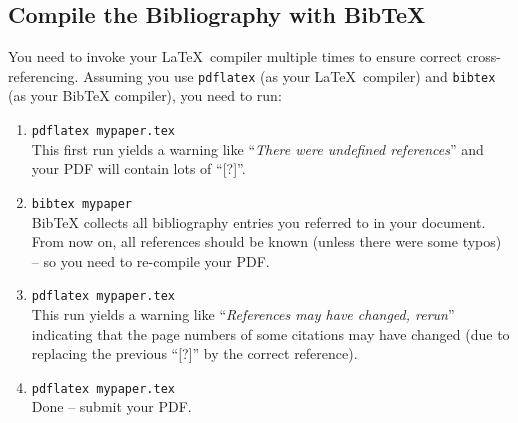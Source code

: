 \documentclass[11pt,a4paper]{article}
\begin{document}
%
\subsection{Compile the Bibliography with BibTeX}
\label{sec-bibtex-compile}

You need to invoke your \LaTeX~compiler multiple times to ensure correct 
cross-referencing.
Assuming you use \texttt{pdflatex} (as your \LaTeX~compiler) and \texttt{bibtex} (as your BibTeX compiler), you need to run:
\begin{enumerate}
 
\item \texttt{pdflatex mypaper.tex}\\[.5em]
This first run yields a warning like ``\emph{There were undefined references}'' and your PDF will contain lots of ``[?]''.

\item \texttt{bibtex mypaper}\\[.5em]
BibTeX collects all bibliography entries you referred to in your document. From now on, all references should be known (unless there were some typos) -- so you need to re-compile your PDF.

\item \texttt{pdflatex mypaper.tex}\\[.5em]
This run yields a warning like ``\emph{References may have changed, rerun}'' indicating that the page numbers of some citations may have changed (due to replacing the previous ``[?]'' by the correct reference).

\item \texttt{pdflatex mypaper.tex}\\[.5em]
Done -- submit your PDF.

\end{enumerate}



\newpage
\end{document}
